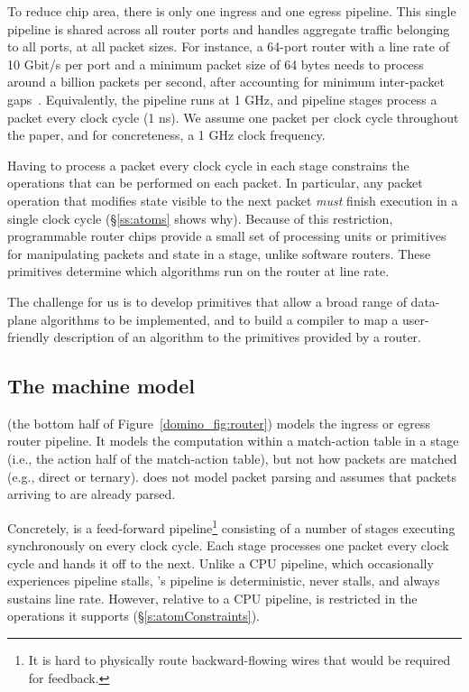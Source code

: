 To reduce chip area, there is only one ingress and one egress pipeline.  This
single pipeline is shared across all router ports and handles aggregate traffic
belonging to all ports, at all packet sizes.  For instance, a 64-port router
with a line rate of 10 Gbit/s per port and a minimum packet size of 64 bytes
needs to process around a billion packets per second, after accounting for
minimum inter-packet gaps~\cite{rmt}.  Equivalently, the pipeline runs at 1
GHz, and pipeline stages process a packet every clock cycle (1 ns).  We assume
one packet per clock cycle throughout the paper, and for concreteness, a
1 GHz clock frequency.

Having to process a packet every clock cycle in each stage constrains
the operations that can be performed on each packet. In particular, any packet
operation that modifies state visible to the next packet {\em must} finish
execution in a single clock cycle (\S\ref{ss:atoms} shows why). Because
of this restriction, programmable router chips provide a small set of
processing units or primitives for manipulating packets and state in a stage,
unlike software routers. These primitives determine which algorithms
run on the router at line rate.

The challenge for us is to develop primitives that allow a broad range of
data-plane algorithms to be implemented, and to build a compiler to map a
user-friendly description of an algorithm to the primitives provided by a
router.

\subsection{The \absmachine machine model}

\absmachine (the bottom half of Figure~\ref{domino_fig:router}) models
the ingress or egress router pipeline.  It models the
computation within a match-action table in a stage (i.e., the action half of
the match-action table), but not how packets are matched (e.g., direct or
ternary). \absmachine does not model packet parsing and assumes
that packets arriving to \absmachine are already parsed.

 Concretely, \absmachine is a feed-forward pipeline\footnote{It is hard to
physically route backward-flowing wires that would be required for feedback.}
consisting of a number of stages executing synchronously on every clock cycle.
Each stage processes one packet every clock cycle and hands it off to the next.
Unlike a CPU pipeline, which occasionally experiences pipeline stalls,
\absmachine's pipeline is deterministic, never stalls, and always sustains line
rate. However, relative to a CPU pipeline, \absmachine is restricted in the
operations it supports (\S\ref{s:atomConstraints}).

